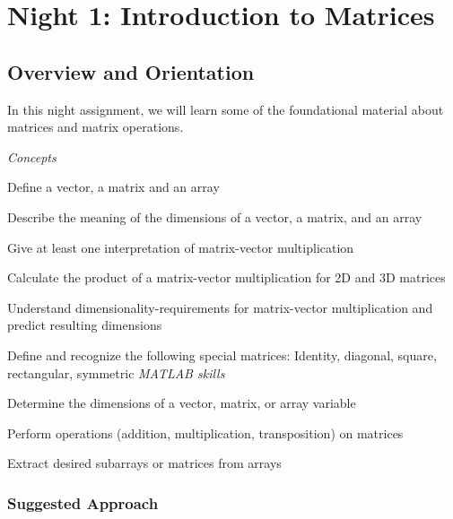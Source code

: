 \chapter{Night 1: Introduction to Matrices}

\section*{Overview and Orientation}
In this night assignment, we will learn some of the foundational material about matrices and matrix operations.

\begin{learningobjectives}
\emph{Concepts}
\bi
\item Define a vector, a matrix and an array
\item Describe the meaning of the dimensions of a vector, a matrix, and an array
\item Give at least one interpretation of matrix-vector multiplication
\item Calculate the product of a matrix-vector multiplication for 2D and 3D matrices
\item Understand dimensionality-requirements for matrix-vector multiplication and predict resulting dimensions
\item Define and recognize the following special matrices: Identity, diagonal, square, rectangular, symmetric
\ei
\emph{MATLAB skills}
\bi
\item Determine the dimensions of a vector, matrix, or array variable
\item Perform operations (addition, multiplication, transposition) on matrices
\item Extract desired subarrays or matrices from arrays
\ei
\end{learningobjectives}

\subsection{Suggested Approach}

